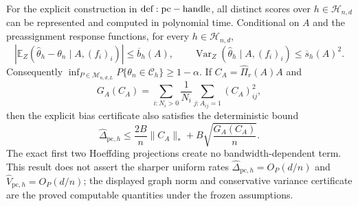 For the explicit construction in \({\rm def:pc-handle}\), all distinct scores over \(h\in\mathcal H_{n,d}\) can be represented and computed in polynomial time.  Conditional on \(A\) and the preassignment response functions, for every \(h\in\mathcal H_{n,d}\),
\[
 \left|\mathbb E_Z(\widehat\theta_h-\theta_n\mid A,(f_i)_i)\right|
 \leq\overline b_h(A),
 \qquad
 \operatorname{Var}_Z(\widehat\theta_h\mid A,(f_i)_i)
 \leq\overline s_h(A)^2.
\]
Consequently \(\inf_{P\in\mathcal M_{n,d,L}}P\{\theta_n\in\mathcal C_h\}\geq1-\alpha\).  If \(C_A=\widehat\Pi_r(A)A\) and
\[
 G_A(C_A)=\sum_{i:N_i>0}\frac1{N_i}\sum_{j:A_{ij}=1}(C_A)_{ij}^2,
\]
then the explicit bias certificate also satisfies the deterministic bound
\[
 \widehat\Delta_{\mathrm{pc},h}
 \leq \frac{2B}{n}\|C_A\|_*
      +B\sqrt{\frac{G_A(C_A)}{n}}.
\]
The exact first two Hoeffding projections create no bandwidth-dependent term.  This result does not assert the sharper uniform rates \(\widehat\Delta_{\mathrm{pc},h}=O_P(d/n)\) and \(\widehat V_{\mathrm{pc},h}=O_P(d/n)\); the displayed graph norm and conservative variance certificate are the proved computable quantities under the frozen assumptions.